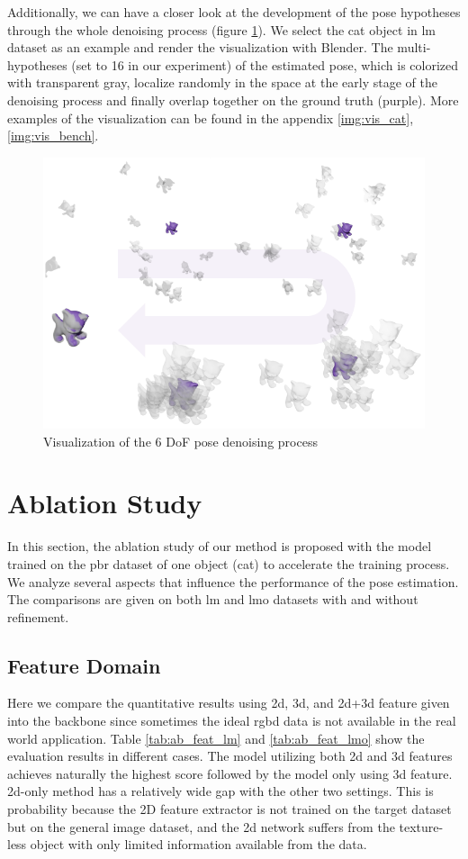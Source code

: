 \documentclass[12pt,DIV14,BCOR12mm,a4paper,footinclude=false,headinclude,parskip=half-,twoside,openright,cleardoublepage=empty,toc=index,bibliography=totoc,listof=totoc]{scrreprt}
\numberwithin{equation}{chapter}
\begin{document}
Additionally, we can have a closer look at the development of the pose hypotheses through the whole denoising process (figure \ref{img:eval_vis_denoise}). We select the cat object in \gls{lm} dataset as an example and render the visualization with Blender. The multi-hypotheses (set to 16 in our experiment) of the estimated pose, which is colorized with transparent gray, localize randomly in the space at the early stage of the denoising process and finally overlap together on the ground truth (purple). More examples of the visualization can be found in the appendix \ref{img:vis_cat}, \ref{img:vis_bench}.  
\begin{figure}[h]
	\centering
	\includegraphics[width=1.\textwidth]{img/vis_denoise.pdf}
	\caption{Visualization of the 6 DoF pose denoising process}
	\label{img:eval_vis_denoise}
\end{figure}

\section{Ablation Study}
In this section, the ablation study of our method is proposed with the model trained on the \gls{pbr} dataset of one object (cat) to accelerate the training process. We analyze several aspects that influence the performance of the pose estimation. The comparisons are given on both \gls{lm} and \gls{lmo} datasets with and without refinement.
\subsection{Feature Domain}\label{sec:ab_feat}
Here we compare the quantitative results using \gls{2d}, \gls{3d}, and \gls{2d}+\gls{3d} feature given into the backbone since sometimes the ideal \gls{rgbd} data is not available in the real world application. Table \ref{tab:ab_feat_lm} and \ref{tab:ab_feat_lmo} show the evaluation results in different cases. The model utilizing both \gls{2d} and \gls{3d} features achieves naturally the highest score followed by the model only using \gls{3d} feature. \gls{2d}-only method has a relatively wide gap with the other two settings. This is probability because the 2D feature extractor is not trained on the target dataset but on the general image dataset, and the \gls{2d} network suffers from the texture-less object with only limited information available from the data.
\end{document}
